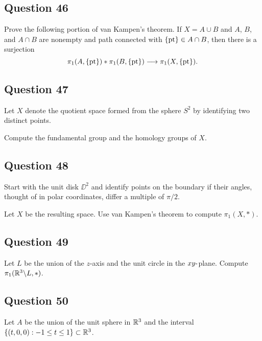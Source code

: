\documentclass[12pt]{article}
\begin{document}
\hypertarget{question-46-3}{%
\subsection{Question 46}\label{question-46-3}}

Prove the following portion of van Kampen's theorem. If \(X = A\cup B\)
and \(A\), \(B\), and \(A \cap B\) are nonempty and path connected with
\(\{\text{pt}\} \in A \cap B\), then there is a surjection \[
\pi_1 (A, \{\text{pt}\}) \ast \pi_1 (B, \{\text{pt}\}) \longrightarrow \pi_1 (X, \{\text{pt}\})
.\]

\hypertarget{question-47-3}{%
\subsection{Question 47}\label{question-47-3}}

Let \(X\) denote the quotient space formed from the sphere \(S^2\) by
identifying two distinct points.

Compute the fundamental group and the homology groups of \(X\).

\hypertarget{question-48-3}{%
\subsection{Question 48}\label{question-48-3}}

Start with the unit disk \(\DD^2\) and identify points on the boundary
if their angles, thought of in polar coordinates, differ a multiple of
\(\pi/2\).

Let \(X\) be the resulting space. Use van Kampen's theorem to compute
\(\pi_1 (X, \ast)\).

\hypertarget{question-49-3}{%
\subsection{Question 49}\label{question-49-3}}

Let \(L\) be the union of the \(z\)-axis and the unit circle in the
\(xy{\hbox{-}}\)plane. Compute \(\pi_1 ({\mathbb{R}}^3 \backslash L, \ast)\).

\hypertarget{question-50-3}{%
\subsection{Question 50}\label{question-50-3}}

Let \(A\) be the union of the unit sphere in \({\mathbb{R}}^3\) and the interval
\(\left\{{(t, 0, 0) : -1 \leq t \leq 1}\right\} \subset {\mathbb{R}}^3\).
\end{document}
